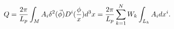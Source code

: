 \begin{equation}
Q=\frac{2\pi }{L_p}\int_MA_i\delta ^2(\vec{\phi})D^i(\frac \phi x)d^3x=\frac{%
2\pi }{L_p}\sum_{k=1}^NW_k\int_{L_k}A_idx^i.  \label{CS1}
\end{equation}

